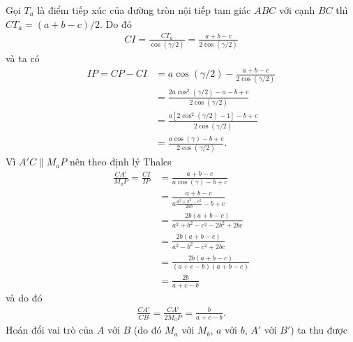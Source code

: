 \begin{multicols}{2}
\begin{figure}[H]
{}
			\vspace*{-10pt}
		\end{figure}
		Gọi $T_a$ là điểm tiếp xúc của đường tròn nội tiếp tam giác $ABC$ với cạnh $BC$ thì $CT_a = (a+b-c)/2$. Do đó 
		\begin{align*}
			CI = \frac{CT_a}{\cos(\gamma/2)} = \frac{a+b-c}{2 \cos(\gamma/2)}
		\end{align*}
		và ta có
		\begin{align*}
		IP = CP - CI & =  a \cos(\gamma/2) - \frac{a+b-c}{2 \cos(\gamma/2)} \\
		& = \frac{2a \cos^2(\gamma/2) -a-b+c}{2 \cos(\gamma/2)} \\
		& = \frac{a[2\cos^2(\gamma /2)-1] - b +c}{2 \cos(\gamma/2)} \\
		& = \frac{a \cos (\gamma)-b+c}{2 \cos(\gamma/2)}.
		\end{align*}
		Vì $A'C \parallel M_aP$ nên theo định lý Thales 
		\begin{align*}
			\frac{CA'}{M_aP} = \frac{CI}{IP} & =  \frac{a+b-c}{a \cos(\gamma) - b +c} \\
			& = \frac{a+b-c}{a\frac{a^2 + b^2 -c^2}{2ab} -b +c} \\
			& = \frac{2b(a+b-c)}{a^2 + b^2 - c^2 - 2b^2 + 2bc} \\
			& = \frac{2b(a+b-c)}{a^2 - b^2 -c^2 + 2bc} \\
			& = \frac{2b(a+b-c)}{(a+c-b)(a+b-c)} \\
			& = \frac{2b}{a+c-b}
		\end{align*}
		và do đó
		\begin{align*} 
			\frac{CA'}{CB} = \frac{CA'}{2M_aP} = \frac{b}{a+c-b}. \tag{$3$}
		\end{align*}
		Hoán đổi vai trò của $A$ với $B$ (do đó $M_a$ với $M_b$, $a$ với $b$, $A'$ với $B'$) ta thu được

\end{multicols}
